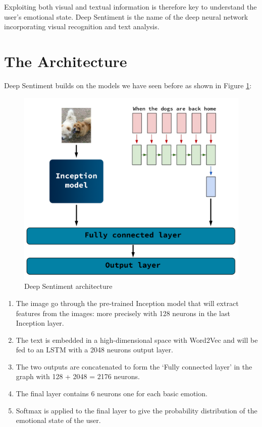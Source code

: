 Exploiting both visual and textual information is therefore key to understand the user's emotional state. Deep Sentiment is the name of the deep neural network incorporating visual recognition and text analysis.

\section{The Architecture}

Deep Sentiment builds on the models we have seen before as shown in Figure \ref{deep-sentiment}:

\begin{figure}[H]
    \centering
    \includegraphics[width=\textwidth]{Images/deep-sentiment.png}
    \caption{Deep Sentiment architecture}
    \label{deep-sentiment}
\end{figure}

\begin{enumerate}
    \item The image go through the pre-trained Inception model that will extract features from the images: more precisely with 128 neurons in the last Inception 
    layer.
    \item The text is embedded in a high-dimensional space with Word2Vec and will be fed to an LSTM with a 2048 neurons output layer.
    \item The two outputs are concatenated to form the `Fully connected layer' in the graph with 128 + 2048 = 2176 neurons. 
    \item The final layer contains 6 neurons one for each basic emotion.
    \item Softmax is applied to the final layer to give the probability distribution of the emotional state of the user.
\end{enumerate}

